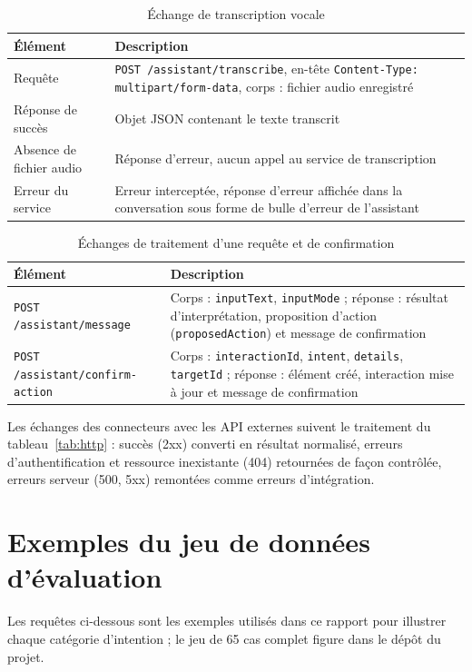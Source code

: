\documentclass[11pt,a4paper,openany,oneside]{report}
\begin{document}
\begin{table}[htbp]
\centering\small
\caption{Échange de transcription vocale}\label{tab:ann-http}
\begin{tabularx}{\textwidth}{@{}p{4cm}X@{}}
\toprule
\textbf{Élément} & \textbf{Description} \\
\midrule
Requête & \texttt{POST /assistant/transcribe}, en-tête \texttt{Content-Type: multipart/form-data}, corps : fichier audio enregistré \\
Réponse de succès & Objet JSON contenant le texte transcrit \\
Absence de fichier audio & Réponse d'erreur, aucun appel au service de transcription \\
Erreur du service & Erreur interceptée, réponse d'erreur affichée dans la conversation sous forme de bulle d'erreur de l'assistant \\
\bottomrule
\end{tabularx}
\end{table}

\begin{table}[htbp]
\centering\small
\caption{Échanges de traitement d'une requête et de confirmation}\label{tab:ann-http2}
\begin{tabularx}{\textwidth}{@{}p{4cm}X@{}}
\toprule
\textbf{Élément} & \textbf{Description} \\
\midrule
\texttt{POST /assistant/message} & Corps : \texttt{inputText}, \texttt{inputMode} ; réponse : résultat d'interprétation, proposition d'action (\texttt{proposedAction}) et message de confirmation \\
\texttt{POST /assistant/confirm-action} & Corps : \texttt{interactionId}, \texttt{intent}, \texttt{details}, \texttt{targetId} ; réponse : élément créé, interaction mise à jour et message de confirmation \\
\bottomrule
\end{tabularx}
\end{table}

Les échanges des connecteurs avec les API externes suivent le traitement du tableau~\ref{tab:http} : succès (2xx) converti en résultat normalisé, erreurs d'authentification et ressource inexistante (404) retournées de façon contrôlée, erreurs serveur (500, 5xx) remontées comme erreurs d'intégration.

\chapter{Exemples du jeu de données d'évaluation}\label{ann:dataset}
Les requêtes ci-dessous sont les exemples utilisés dans ce rapport pour illustrer chaque catégorie d'intention ; le jeu de 65 cas complet figure dans le dépôt du projet.
\end{document}
